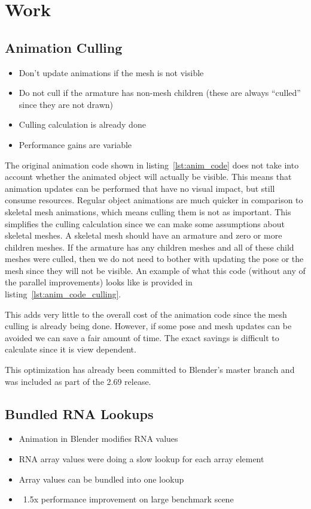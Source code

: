 \section{Work}

\subsection{Animation Culling}
\ifsummaries
\begin{itemize}
 \item Don't update animations if the mesh is not visible
 \item Do not cull if the armature has non-mesh children (these are always ``culled'' since they are not drawn)
 \item Culling calculation is already done
 \item Performance gains are variable
\end{itemize}
\fi

The original animation code shown in listing~\ref{lst:anim_code} does not take into account whether the animated object will actually be visible.
This means that animation updates can be performed that have no visual impact, but still consume resources.
Regular object animations are much quicker in comparison to skeletal mesh animations, which means culling them is not as important.
This simplifies the culling calculation since we can make some assumptions about skeletal meshes.
A skeletal mesh should have an armature and zero or more children meshes.
If the armature has any children meshes and all of these child meshes were culled, then we do not need to bother with updating the pose or the mesh since they will not be visible.
An example of what this code (without any of the parallel improvements) looks like is provided in listing~\ref{lst:anim_code_culling}.


This adds very little to the overall cost of the animation code since the mesh culling is already being done.
However, if some pose and mesh updates can be avoided we can save a fair amount of time.
The exact savings is difficult to calculate since it is view dependent.

This optimization has already been committed to Blender's master branch and was included as part of the 2.69 release.

\subsection{Bundled RNA Lookups}
\ifsummaries
\begin{itemize}
 \item Animation in Blender modifies RNA values
 \item RNA array values were doing a slow lookup for each array element
 \item Array values can be bundled into one lookup
 \item ~1.5x performance improvement on large benchmark scene
\end{itemize}
\fi

